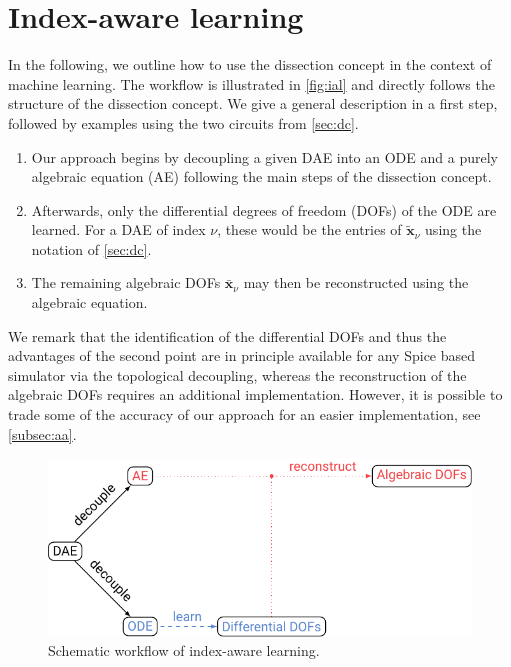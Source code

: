 \documentclass[AMA,STIX1COL]{WileyNJD-v2}
\begin{document}
\section{Index-aware learning}
\label{sec:ial}
In the following, we outline how to use the dissection concept in the context of machine learning. The workflow is illustrated in \autoref{fig:ial} and directly follows the structure of the dissection concept. We give a general description in a first step, followed by examples using the two circuits from \autoref{sec:dc}.
\begin{enumerate}
    \item Our approach begins by decoupling a given DAE into an ODE and a purely algebraic equation (AE) following the main steps of the dissection concept.

    \item Afterwards, only the differential degrees of freedom (DOFs) of the ODE are learned. For a DAE of index $\nu$, these would be the entries of $\tilde{\mathbf{x}}_\nu$ using the notation of \autoref{sec:dc}.

    \item The remaining algebraic DOFs $\bar{\mathbf{x}}_\nu$ may then be reconstructed using the algebraic equation.
\end{enumerate}
We remark that the identification of the differential DOFs and thus the advantages of the second point are in principle available for any Spice based simulator via the topological decoupling\cite{jansen2014}, whereas the reconstruction of the algebraic DOFs requires an additional implementation. However, it is possible to trade some of the accuracy of our approach for an easier implementation, see \autoref{subsec:aa}.
\begin{figure}
    \begin{center}
        \includegraphics[width=.7\textwidth]{ial}
    \end{center}
    \caption{Schematic workflow of index-aware learning.}
    \label{fig:ial}
\end{figure}
\end{document}
